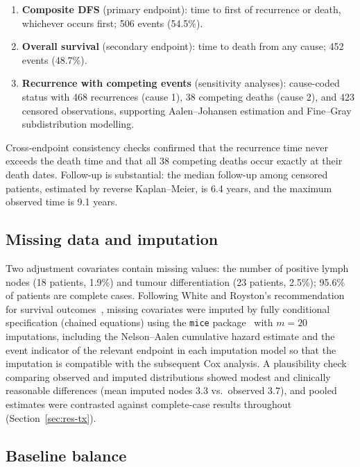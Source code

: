 \begin{enumerate}[leftmargin=1.7em, itemsep=1.5pt, topsep=3pt]
  \item \textbf{Composite DFS} (primary endpoint): time to first of
        recurrence or death, whichever occurs first; 506 events (54.5\%).
  \item \textbf{Overall survival} (secondary endpoint): time to death from
        any cause; 452 events (48.7\%).
  \item \textbf{Recurrence with competing events} (sensitivity analyses):
        cause-coded status with 468 recurrences (cause 1), 38 competing
        deaths (cause 2), and 423 censored observations, supporting
        Aalen--Johansen estimation and Fine--Gray subdistribution
        modelling.
\end{enumerate}

Cross-endpoint consistency checks confirmed that the recurrence time never
exceeds the death time and that all 38 competing deaths occur exactly at
their death dates. Follow-up is substantial: the median follow-up among
censored patients, estimated by reverse Kaplan--Meier, is 6.4 years, and
the maximum observed time is 9.1 years.

\subsection{Missing data and imputation}

Two adjustment covariates contain missing values: the number of positive
lymph nodes (18 patients, 1.9\%) and tumour differentiation (23 patients,
2.5\%); 95.6\% of patients are complete cases. Following White and
Royston's recommendation for survival outcomes~\cite{white2009}, missing
covariates were imputed by fully conditional specification (chained
equations) using the \texttt{mice} package~\cite{mice2011} with $m=20$
imputations, including the Nelson--Aalen cumulative hazard estimate and
the event indicator of the relevant endpoint in each imputation model so
that the imputation is compatible with the subsequent Cox analysis. A
plausibility check comparing observed and imputed distributions showed
modest and clinically reasonable differences (mean imputed nodes 3.3 vs.\
observed 3.7), and pooled estimates were
contrasted against complete-case results throughout
(Section~\ref{sec:res-tx}).

\subsection{Baseline balance}

